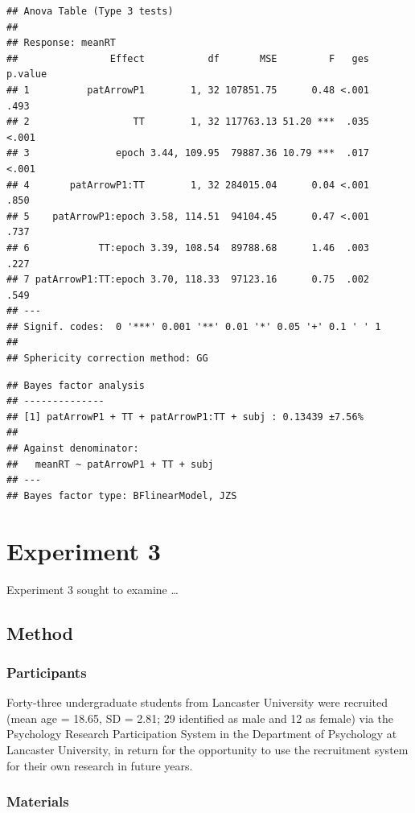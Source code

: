\documentclass[
  man]{apa7}
\begin{document}
\begin{verbatim}
## Anova Table (Type 3 tests)
## 
## Response: meanRT
##                Effect           df       MSE         F   ges p.value
## 1          patArrowP1        1, 32 107851.75      0.48 <.001    .493
## 2                  TT        1, 32 117763.13 51.20 ***  .035   <.001
## 3               epoch 3.44, 109.95  79887.36 10.79 ***  .017   <.001
## 4       patArrowP1:TT        1, 32 284015.04      0.04 <.001    .850
## 5    patArrowP1:epoch 3.58, 114.51  94104.45      0.47 <.001    .737
## 6            TT:epoch 3.39, 108.54  89788.68      1.46  .003    .227
## 7 patArrowP1:TT:epoch 3.70, 118.33  97123.16      0.75  .002    .549
## ---
## Signif. codes:  0 '***' 0.001 '**' 0.01 '*' 0.05 '+' 0.1 ' ' 1
## 
## Sphericity correction method: GG
\end{verbatim}

\begin{verbatim}
## Bayes factor analysis
## --------------
## [1] patArrowP1 + TT + patArrowP1:TT + subj : 0.13439 ±7.56%
## 
## Against denominator:
##   meanRT ~ patArrowP1 + TT + subj 
## ---
## Bayes factor type: BFlinearModel, JZS
\end{verbatim}

\hypertarget{experiment-3}{%
\section{Experiment 3}\label{experiment-3}}

Experiment 3 sought to examine \ldots{}

\hypertarget{method-2}{%
\subsection{Method}\label{method-2}}

\hypertarget{participants-2}{%
\subsubsection{Participants}\label{participants-2}}

Forty-three undergraduate students from Lancaster University were recruited (mean age = 18.65, SD = 2.81; 29 identified as male and 12 as female) via the Psychology Research Participation System in the Department of Psychology at Lancaster University, in return for the opportunity to use the recruitment system for their own research in future years.

\hypertarget{materials-2}{%
\subsubsection{Materials}\label{materials-2}}
\end{document}
